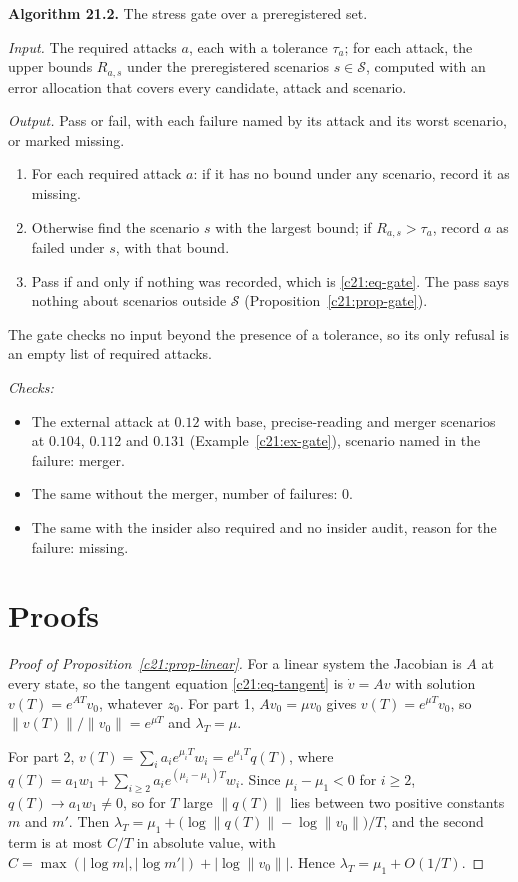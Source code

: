 \begin{mdframed}[linecolor=gray!60,backgroundcolor=gray!5]
\medskip
\textbf{Algorithm 21.2.} The stress gate over a preregistered set.\par\smallskip
\textit{Input.} The required attacks $a$, each with a tolerance $\tau_a$; for each attack, the upper bounds
$R_{a,s}$ under the preregistered scenarios $s\in\mathcal S$, computed with an error allocation that covers every
candidate, attack and scenario.\par
\textit{Output.} Pass or fail, with each failure named by its attack and its worst scenario, or marked missing.
\begin{enumerate}
\item For each required attack $a$: if it has no bound under any scenario, record it as missing.
\item Otherwise find the scenario $s$ with the largest bound; if $R_{a,s}>\tau_a$, record $a$ as failed under $s$, with that bound.
\item Pass if and only if nothing was recorded, which is \eqref{c21:eq-gate}. The pass says nothing about scenarios outside $\mathcal S$ (Proposition~\ref{c21:prop-gate}).
\end{enumerate}
The gate checks no input beyond the presence of a tolerance, so its only refusal is an empty list of required attacks.\par
\textit{Checks:}
\begin{itemize}
\item The external attack at $0.12$ with base, precise-reading and merger scenarios at $0.104$, $0.112$ and $0.131$ (Example~\ref{c21:ex-gate}), scenario named in the failure: merger.
\item The same without the merger, number of failures: 0.
\item The same with the insider also required and no insider audit, reason for the failure: missing.
\end{itemize}
\end{mdframed}

\section{Proofs}

\begin{proof}[Proof of Proposition~\ref{c21:prop-linear}]
For a linear system the Jacobian is $A$ at every state, so the tangent equation \eqref{c21:eq-tangent} is
$\dot v=Av$ with solution $v(T)=e^{AT}v_0$, whatever $z_0$. For part 1, $Av_0=\mu v_0$ gives $v(T)=e^{\mu T}v_0$,
so $\|v(T)\|/\|v_0\|=e^{\mu T}$ and $\lambda_T=\mu$.

For part 2, $v(T)=\sum_ia_ie^{\mu_iT}w_i=e^{\mu_1T}q(T)$, where $q(T)=a_1w_1+\sum_{i\ge2}a_ie^{(\mu_i-\mu_1)T}w_i$.
Since $\mu_i-\mu_1<0$ for $i\ge2$, $q(T)\to a_1w_1\ne0$, so for $T$ large $\|q(T)\|$ lies between two positive
constants $m$ and $m'$. Then $\lambda_T=\mu_1+\big(\log\|q(T)\|-\log\|v_0\|\big)/T$, and the second term is at
most $C/T$ in absolute value, with $C=\max(|\log m|,|\log m'|)+|\log\|v_0\||$. Hence $\lambda_T=\mu_1+O(1/T)$.
\end{proof}

